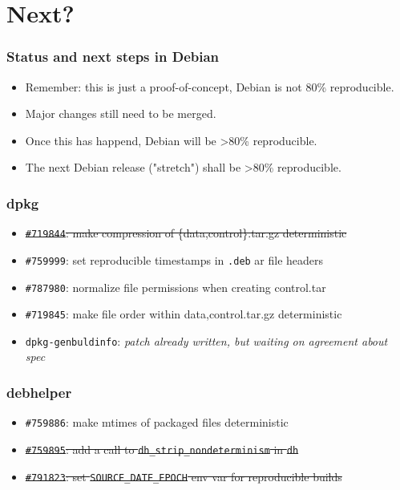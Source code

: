 \documentclass[14pt]{beamer}
\begin{document}
\section{Next?}

\begin{frame}
 \frametitle{Status and next steps in Debian}
 \begin{itemize}
  \item Remember: this is just a proof-of-concept, Debian is not 80\%
  reproducible.
  \item Major changes still need to be merged.
  \item Once this has happend, Debian will be >80\% reproducible.
  \item The next Debian release ("stretch") shall be >80\% reproducible.
 \end{itemize}
\end{frame}

\begin{frame}
 \frametitle{dpkg}

 \begin{itemize}\small
  \item \sout{\texttt{\#719844}: make compression of \{data,control\}.tar.gz deterministic}
  \item \texttt{\#759999}: set reproducible timestamps in \texttt{.deb} ar file headers
  \item \texttt{\#787980}: normalize file permissions when creating control.tar
  \item \texttt{\#719845}: make file order within {data,control}.tar.gz deterministic
  \item \texttt{dpkg-genbuldinfo}: \textit{patch already written, but waiting on agreement about spec}
 \end{itemize}
\end{frame}

\begin{frame}
 \frametitle{debhelper}

 \begin{itemize}\small
  \item \texttt{\#759886}: make mtimes of packaged files deterministic
  \item \sout{\texttt{\#759895}: add a call to
  \texttt{dh\_strip\_nondeterminism} in \texttt{dh}}
  \item \sout{\texttt{\#791823}: set \texttt{SOURCE\_DATE\_EPOCH} env var for
  reproducible builds}
 \end{itemize}
\end{frame}
\end{document}
